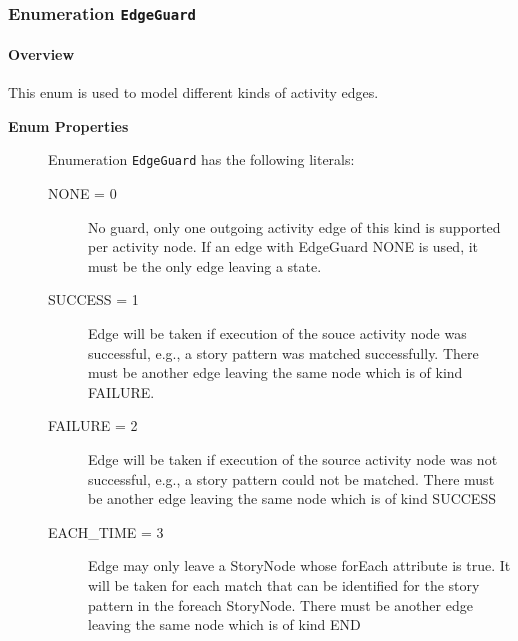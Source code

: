 \subsubsection{\Large{Enumeration \bfseries \texttt{EdgeGuard}\normalfont}}
\label{cls:modeling::activities::EdgeGuard} 
\paragraph{Overview}
	
			
This enum is used to model different kinds of activity edges. 	
		
	


\begin{description}

	\item[\textbf{Enum Properties}] Enumeration \texttt{EdgeGuard} has the following literals:

	\begin{description}
		
		\item[NONE = 0]
		\hspace{\fill}
		\nopagebreak
		
No guard, only one outgoing activity edge of this kind is supported per activity node. If an edge with EdgeGuard NONE is used, it must be the only edge leaving a state.	

		\item[SUCCESS = 1]
		\hspace{\fill}
		\nopagebreak
		
Edge will be taken if execution of the souce activity node was successful, e.g., a story pattern was matched successfully. There must be another edge leaving the same node which is of kind FAILURE.	

		\item[FAILURE = 2]
		\hspace{\fill}
		\nopagebreak
		
Edge will be taken if execution of the source activity node was not successful, e.g., a story pattern could not be matched. There must be another edge leaving the same node which is of kind SUCCESS	

		\item[EACH\_TIME = 3]
		\hspace{\fill}
		\nopagebreak
		
Edge may only leave a StoryNode whose forEach attribute is true. It will be taken for each match that can be identified for the story pattern in the foreach StoryNode. There must be another edge leaving the same node which is of kind END	


\end{description}
\end{description}
